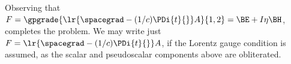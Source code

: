 {%
Observing that \( F = \gpgrade{ \lr{ \spacegrad -(1/c) \PDi{t}{} } A }{1,2} = \BE + I \eta \BH \), completes the problem.
We may write just \( F = \lr{ \spacegrad -(1/c) \PDi{t}{} } A \), if
the Lorentz gauge condition is assumed, as the scalar and pseudoscalar components above are obliterated.
} %
